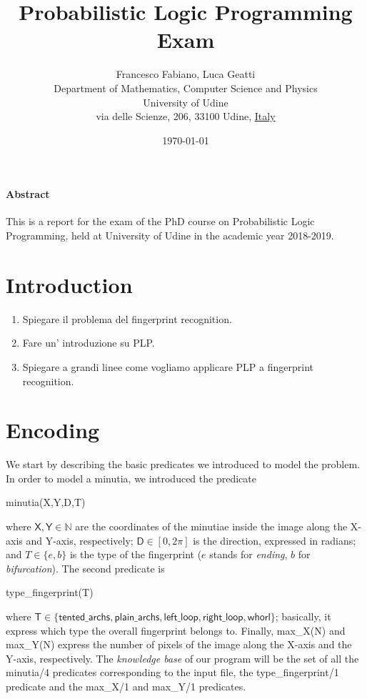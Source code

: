 \documentclass[8pt]{article}
\title{Probabilistic Logic Programming Exam}
\author{
        Francesco Fabiano, Luca Geatti\\
        \footnotesize Department of Mathematics, Computer Science and Physics \\
        \footnotesize University of Udine\\
        \footnotesize via delle Scienze, 206, 33100 Udine, \underline{Italy}
}
\date{\footnotesize\today}
\begin{document}
\maketitle
\paragraph{Abstract}
This is a report for the exam of the PhD course on Probabilistic Logic
Programming, held at University of Udine in the academic year 2018-2019.



\section{Introduction}
\begin{enumerate}
  \item
    Spiegare il problema del fingerprint recognition.
  \item
    Fare un' introduzione su PLP.
  \item
    Spiegare a grandi linee come vogliamo applicare PLP a 
    fingerprint recognition.
\end{enumerate}




\section{Encoding}
\label{sec:encoding}
We start by describing the basic predicates we introduced to model
the problem. In order to model a minutia, we introduced the predicate
  \begin{center}
    \textsf{minutia(X,Y,D,T)}
  \end{center}
where $\textsf{X},\textsf{Y} \in \mathbb{N}$ are the coordinates of the minutiae 
inside the image along the X-axis and Y-axis, respectively;
$\textsf{D} \in [0,2\pi]$ is the direction, expressed in radians; 
and $T \in \{e,b\}$ is the type of the fingerprint ($e$ stands for
\emph{ending}, $b$ for \emph{bifurcation}).
The second predicate is
  \begin{center}
    \textsf{type\_fingerprint(T)}
  \end{center}
where $\textsf{T}\in\{
  \textsf{tented\_archs},
  \textsf{plain\_archs},
  \textsf{left\_loop},
  \textsf{right\_loop},
  \textsf{whorl}
\}$; 
basically, it express which type the overall fingerprint belongs to.
Finally, \textsf{max\_X(N)} and \textsf{max\_Y(N)} express the number
of pixels of the image along the X-axis and the Y-axis, respectively.
The \emph{knowledge base} of our program will be the set of all the 
\textsf{minutia/4} predicates corresponding to the input file,
the \textsf{type\_fingerprint/1} predicate and the \textsf{max\_X/1}
and \textsf{max\_Y/1} predicates.
\end{document}
